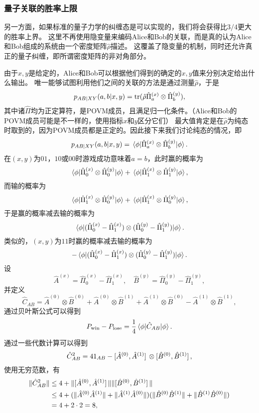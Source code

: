 \documentclass[hyperref, UTF8, a4paper]{ctexart}
\begin{document}
\subsubsection{量子关联的胜率上限}

另一方面，如果标准的量子力学的纠缠态是可以实现的，我们将会获得比$3/4$更大的胜率上界。
这里不再使用隐变量来编码Alice和Bob的关联，而是真的认为Alice和Bob组成的系统由一个密度矩阵$\hat{\rho}$描述。
这覆盖了隐变量的机制，同时还允许真正的量子纠缠，即所谓密度矩阵的非对角部分。

由于$x, y$是给定的，Alice和Bob可以根据他们得到的确定的$x, y$值来分别决定给出什么输出。
唯一能够试图利用他们之间的关联的方法是通过测量$\hat{\rho}$，于是
\[
    p_{AB|XY}(a, b | x, y) = \trace (\hat{\rho} \hat{\Pi}_{a}^{(x)} \otimes \hat{\Pi}_{b}^{(y)}),
\]
其中诸$\hat{\Pi}$均为正定算符，是POVM成员，且满足归一化条件。（Alice和Bob的POVM成员可能是不一样的，使用指标$x$和$y$区分它们）
最大值肯定是在$\hat{\rho}$为纯态时取到的，因为POVM成员都是正定的。因此接下来我们讨论纯态的情况，即
\[
    p_{AB|XY}(a, b | x, y) = \mel{\phi}{\hat{\Pi}_{a}^{(x)} \otimes \hat{\Pi}_{b}^{(y)}}{\phi}.
\]
在$(x, y)$为$01$，$10$或$00$时游戏成功意味着$a=b$，此时赢的概率为
\[
    \mel{\phi}{\hat{\Pi}^{(x)}_0 \otimes \hat{\Pi}^{(y)}_0}{\phi} + \mel{\phi}{\hat{\Pi}^{(x)}_1 \otimes \hat{\Pi}^{(y)}_1}{\phi},
\]
而输的概率为
\[
    \mel{\phi}{\hat{\Pi}^{(x)}_1 \otimes \hat{\Pi}^{(y)}_0}{\phi} + \mel{\phi}{\hat{\Pi}^{(x)}_1 \otimes \hat{\Pi}^{(y)}_0}{\phi},
\]
于是赢的概率减去输的概率为
\[
    \mel{\phi}{(\hat{\Pi}_0^{(x)} - \hat{\Pi}_1^{(x)}) \otimes (\hat{\Pi}_0^{(y)} - \hat{\Pi}_1^{(y)})}{\phi}.
\]
类似的，$(x, y)$为$11$时赢的概率减去输的概率为
\[
    - \mel{\phi}{(\hat{\Pi}_0^{(x)} - \hat{\Pi}_1^{(x)}) \otimes (\hat{\Pi}_0^{(y)} - \hat{\Pi}_1^{(y)})}{\phi}.
\]
设
\[
    \hat{A}^{(x)} = \hat{\Pi}^{(x)}_0 - \hat{\Pi}^{(x)}_1, \quad \hat{B}^{(y)} = \hat{\Pi}^{(y)}_0 - \hat{\Pi}^{(y)}_1,
\]
并定义
\[
    \hat{C}_{AB} = \hat{A}^{(0)} \otimes \hat{B}^{(0)} + \hat{A}^{(0)} \otimes \hat{B}^{(1)} + \hat{A}^{(1)} \otimes \hat{B}^{(0)} - \hat{A}^{(1)} \otimes \hat{B}^{(1)},
\]
通过贝叶斯公式可以得到
\[
    P_\text{win} - P_\text{lose} = \frac{1}{4} \mel{\phi}{\hat{C}_{AB}}{\phi}.
\]
通过一些代数计算可以得到
\[
    \hat{C}_{AB}^2 = 4 1_{AB} - \comm*{\hat{A}^{(0)}}{\hat{A}^{(1)}} \otimes \comm*{\hat{B}^{(0)}}{\hat{B}^{(1)}},
\]
使用无穷范数，有
\[
    \begin{aligned}
        \|\hat{C}_{AB}^2\| &\leq 4 + \|\comm*{\hat{A}^{(0)}}{\hat{A}^{(1)}}\| \|\comm*{\hat{B}^{(0)}}{\hat{B}^{(1)}}\| \\
        &\leq 4 + (\|\hat{A}^{(0)} \hat{A}^{(1)}\| + \|\hat{A}^{(1)} \hat{A}^{(0)}\|) (\|\hat{B}^{(0)} \hat{B}^{(1)}\| + \|\hat{B}^{(1)} \hat{B}^{(0)}\|) \\
        &= 4 + 2 \cdot 2 = 8,
    \end{aligned}
\]
\end{document}

